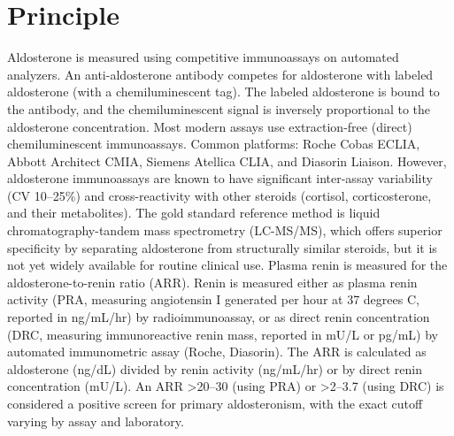 \section*{Principle}
Aldosterone is measured using competitive immunoassays on automated analyzers. An anti-aldosterone antibody competes for aldosterone with labeled aldosterone (with a chemiluminescent tag). The labeled aldosterone is bound to the antibody, and the chemiluminescent signal is inversely proportional to the aldosterone concentration. Most modern assays use extraction-free (direct) chemiluminescent immunoassays. Common platforms: Roche Cobas ECLIA, Abbott Architect CMIA, Siemens Atellica CLIA, and Diasorin Liaison. However, aldosterone immunoassays are known to have significant inter-assay variability (CV 10--25\%) and cross-reactivity with other steroids (cortisol, corticosterone, and their metabolites). The gold standard reference method is liquid chromatography-tandem mass spectrometry (LC-MS/MS), which offers superior specificity by separating aldosterone from structurally similar steroids, but it is not yet widely available for routine clinical use. Plasma renin is measured for the aldosterone-to-renin ratio (ARR). Renin is measured either as plasma renin activity (PRA, measuring angiotensin I generated per hour at 37 degrees C, reported in ng/mL/hr) by radioimmunoassay, or as direct renin concentration (DRC, measuring immunoreactive renin mass, reported in mU/L or pg/mL) by automated immunometric assay (Roche, Diasorin). The ARR is calculated as aldosterone (ng/dL) divided by renin activity (ng/mL/hr) or by direct renin concentration (mU/L). An ARR >20--30 (using PRA) or >2--3.7 (using DRC) is considered a positive screen for primary aldosteronism, with the exact cutoff varying by assay and laboratory.

